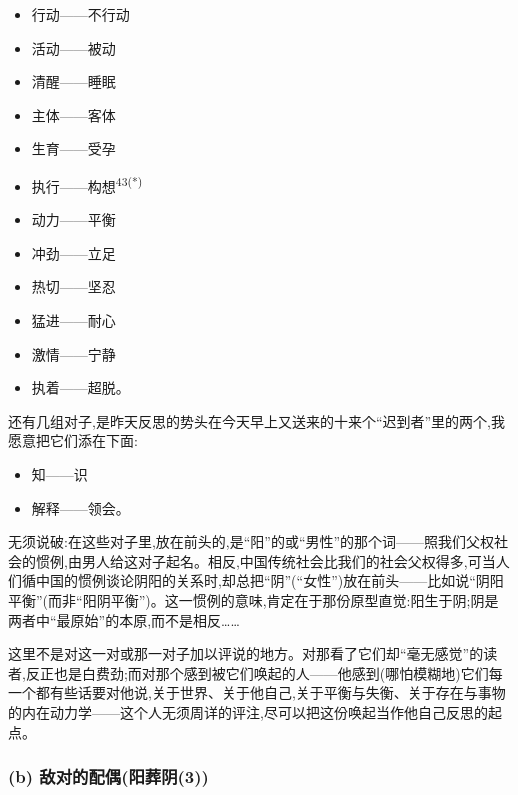 \begin{itemize}
\item 行动——不行动
\item 活动——被动
\item 清醒——睡眠
\item 主体——客体
\item 生育——受孕
\item 执行——构想\textsuperscript{43(*)}
\item \dmark{}动力——平衡
\item 冲劲——立足
\item 热切——坚忍
\item 猛进——耐心
\item 激情——宁静
\item 执着——超脱。
\end{itemize}

还有几组对子,是昨天反思的势头在今天早上又送来的十来个“迟到者”里的两个,我愿意把它们添在下面:

\begin{itemize}
\item 知——识
\item 解释——领会。
\end{itemize}

无须说破:在这些对子里,放在前头的,是“阳”的或“男性”的那个词——照我们父权社会的惯例,由男人给这对子起名。相反,中国传统社会比我们的社会父权得多,可当人们循中国的惯例谈论阴阳的关系时,却总把“阴”(“女性”)放在前头——比如说“阴阳平衡”(而非“阳阴平衡”)。这一惯例的意味,肯定在于那份原型直觉:阳生于阴;阴是两者中“最原始”的本原,而不是相反……

这里不是对这一对或那一对子加以评说的地方。对那看了它们却“毫无感觉”的读者,反正也是白费劲;而对那个感到被它们唤起的人——他感到(哪怕模糊地)它们每一个都有些话要对他说,关于世界、关于他自己,关于平衡与失衡、关于存在与事物的内在动力学——这个人无须周详的评注,尽可以把这份唤起当作他自己反思的起点。

\subsubsection*{(b) 敌对的配偶(阳葬阴(3))}
\label{ch18:local:h13}

\label{ch18:local:n12}

